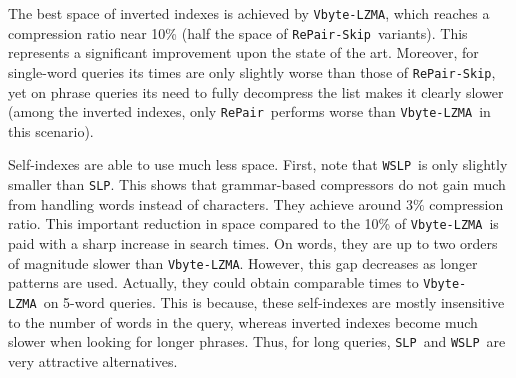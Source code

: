 \documentclass[review]{elsarticle}
\newcommand{\repair}{Re-Pair}
\newcommand{\simplen}{\texttt{Simple9}}
\newcommand{\vbyteCM}{\texttt{Vbyte-CM}}
\newcommand{\vbyteST}{\texttt{Vbyte-ST}}
\newcommand{\repairNo}{\texttt{RePair}}
\newcommand{\repairSkip}{\texttt{RePair-Skip}}
\newcommand{\vbyteLZMA}{\texttt{Vbyte-LZMA}}
\newcommand{\rlcsa}{\texttt{RLCSA}}
\newcommand{\wcsa}{\texttt{WCSA}}
\newcommand{\slp}{\texttt{SLP}}
\newcommand{\wslp}{\texttt{WSLP}}
\newcommand{\lzindex}{\texttt{LZ77-index}}
\newcommand{\lzendindex}{\texttt{LZend-index}}
\begin{document}
%
The best space of inverted indexes is achieved by \vbyteLZMA, which reaches
a compression ratio near 10\% (half the space of \repairSkip\ variants). This represents a significant improvement upon the state of the art. Moreover, for single-word queries its times are
only slightly worse than those of \repairSkip, yet on phrase queries its need
to fully decompress the list makes it clearly slower (among the inverted indexes, only \repairNo\ performs worse than \vbyteLZMA\ in this scenario).

Self-indexes are able to use much less space. First, note that \wslp\ is only 
slightly smaller than \slp. This shows that grammar-based compressors do not gain
much from handling words instead of characters. They achieve around $3\%$
compression ratio. This important reduction in space compared to the 10\% of
\vbyteLZMA\ is paid with
a sharp increase in search times. On words, they are up to two orders of magnitude slower 
than \vbyteLZMA. However, this gap decreases as longer patterns are used. Actually, they could obtain comparable times to \vbyteLZMA\ on 5-word queries. This is because, these self-indexes are mostly 
insensitive to the number of words in the query, whereas inverted indexes become 
much slower when looking for longer phrases. Thus, for long queries, 
\slp\ and \wslp\ are very attractive alternatives.

%
\end{document}
